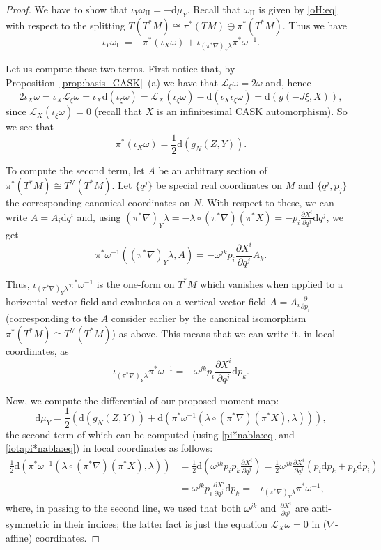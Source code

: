 \documentclass{article}
\theoremstyle{definition}
\newcommand{\hor}{\mathrm{H}}
\newcommand{\ver}{\mathrm{V}}
\newcommand{\pd}[2]{\frac{\partial #1}{\partial #2}}
\renewcommand{\d}{\mathrm{d}}
\begin{document}
	\begin{proof}
		We have to show that $\iota_Y\omega_\hor=-\d\mu_Y$. Recall that $\omega_\hor$ is given by \eqref{oH:eq} with respect to the splitting $T(T^*M)\cong\pi^*(TM)\oplus\pi^*(T^*M)$. Thus we have $$\iota_Y\omega_\hor=-\pi^*(\iota_X\omega)+\iota_{(\pi^*\nabla)_Y\lambda}\pi^*\omega^{-1}.$$
		
		Let us compute these two terms. First notice that, by Proposition~\ref{prop:basis_CASK}~(a) we have that 
		$\mathcal L_\xi\omega=2\omega$ and, hence $$2\iota_X\omega=\iota_X\mathcal L_\xi\omega =\iota_X\d(\iota_\xi\omega)=\mathcal L_X(\iota_\xi\omega)-\d(\iota_X\iota_\xi\omega)=\d(g(-J\xi,X)),$$ 
		since $\mathcal L_X(\iota_\xi\omega)=0$ (recall that $X$ is an infinitesimal CASK automorphism). So we see that \begin{equation}\label{iotaXomega:eq}
			\pi^*(\iota_X\omega)=\frac{1}{2}\d(g_N(Z,Y)).
		\end{equation}
	
		To compute the second term, let $A$ be an arbitrary section of $\pi^*(T^*M)\cong T^\ver(T^*M)$. Let $\{q^j\}$ be special real coordinates on $M$ and $\{q^j,p_j\}$ the corresponding canonical coordinates on $N$. With respect to these, we can write $A=A_i\d q^i$ and, using $(\pi^*\nabla)_Y\lambda=-\lambda\circ(\pi^*\nabla)(\pi^*X)=-p_i\pd{X^i}{q^j}\d q^j$, we get $$\pi^*\omega^{-1}((\pi^*\nabla)_Y\lambda,A)=-\omega^{jk}p_i\pd{X^i}{q^j}A_k.$$
		
		Thus, $\iota_{(\pi^*\nabla)_Y\lambda}\pi^*\omega^{-1}$ is the one-form on $T^*M$ which vanishes when applied to a horizontal vector field and evaluates on a vertical vector field $A=A_i\pd{}{p_i}$ (corresponding to the $A$ consider earlier by the canonical isomorphism $\pi^*(T^*M)\cong T^\ver(T^*M)$) as above. This means that we can write it, in local coordinates, as \begin{equation}\label{iotapi*nabla:eq}
			\iota_{(\pi^*\nabla)_Y\lambda}\pi^*\omega^{-1}=-\omega^{jk}p_i\pd{X^i}{q^j}\d p_k.
		\end{equation}
	
		Now, we compute the differential of our proposed moment map: $$\d\mu_Y=\frac{1}{2}\left(\d(g_N(Z,Y))+\d(\pi^*\omega^{-1}(\lambda\circ(\pi^*\nabla)(\pi^*X),\lambda))\right),$$ the second term of which can be computed (using \eqref{pi*nabla:eq} and \eqref{iotapi*nabla:eq}) in local coordinates as follows: \begin{align*}
			\frac{1}{2}\d(\pi^*\omega^{-1}(\lambda\circ(\pi^*\nabla)(\pi^*X),\lambda))&=\frac{1}{2}\d\left(\omega^{jk}p_ip_k\pd{X^i}{q^j}\right)=\frac{1}{2}\omega^{jk}\pd{X^i}{q^j}(p_i\d p_k+p_k\d p_i)\\
			&=\omega^{jk}p_i\pd{X^i}{q^j}\d p_k=-\iota_{(\pi^*\nabla)_Y\lambda}\pi^*\omega^{-1},
		\end{align*} where, in passing to the second line, we used that both $\omega^{jk}$ and $\pd{X^i}{q^j}$ are anti-symmetric in their indices; the latter fact is just the equation $\mathcal L_X \omega=0$ in ($\nabla$-affine) coordinates.\medskip
  

\end{proof}
\end{document}

